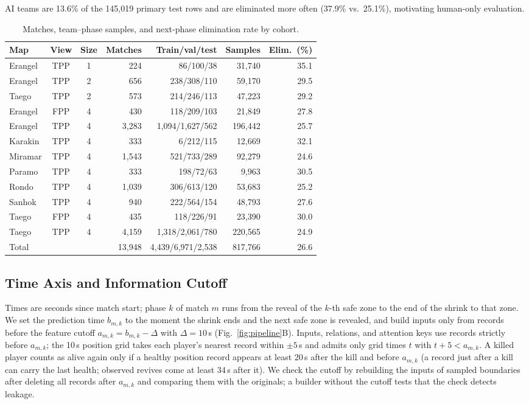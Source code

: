 \documentclass[sigconf,anonymous,nonacm]{acmart}
\begin{document}
AI teams are 13.6\% of the 145,019 primary test rows and are eliminated more often (37.9\% vs.\ 25.1\%), motivating human-only evaluation.

\begin{table}[t]
\centering
\caption{Matches, team--phase samples, and next-phase elimination rate by cohort.}
\label{tab:cohorts}
\footnotesize
\setlength{\tabcolsep}{2.7pt}
\begin{tabular}{lccrrrr}
\hline
Map & View & Size & Matches & Train/val/test & Samples & Elim.\ (\%) \\
\hline
Erangel & TPP & 1 & 224 & 86/100/38 & 31,740 & 35.1 \\
Erangel & TPP & 2 & 656 & 238/308/110 & 59,170 & 29.5 \\
Taego & TPP & 2 & 573 & 214/246/113 & 47,223 & 29.2 \\
Erangel & FPP & 4 & 430 & 118/209/103 & 21,849 & 27.8 \\
Erangel & TPP & 4 & 3,283 & 1,094/1,627/562 & 196,442 & 25.7 \\
Karakin & TPP & 4 & 333 & 6/212/115 & 12,669 & 32.1 \\
Miramar & TPP & 4 & 1,543 & 521/733/289 & 92,279 & 24.6 \\
Paramo & TPP & 4 & 333 & 198/72/63 & 9,963 & 30.5 \\
Rondo & TPP & 4 & 1,039 & 306/613/120 & 53,683 & 25.2 \\
Sanhok & TPP & 4 & 940 & 222/564/154 & 48,793 & 27.6 \\
Taego & FPP & 4 & 435 & 118/226/91 & 23,390 & 30.0 \\
Taego & TPP & 4 & 4,159 & 1,318/2,061/780 & 220,565 & 24.9 \\
\hline
Total & & & 13,948 & 4,439/6,971/2,538 & 817,766 & 26.6 \\
\hline
\end{tabular}
\end{table}

\subsection{Time Axis and Information Cutoff}
\label{sec:method:samples}
Times are seconds since match start; phase $k$ of match $m$ runs from the reveal of the $k$-th safe zone to the end of the shrink to that zone.
We set the prediction time $b_{m,k}$ to the moment the shrink ends and the next safe zone is revealed, and build inputs only from records before the feature cutoff $a_{m,k}=b_{m,k}-\Delta$ with $\Delta=10$\,s (Fig.~\ref{fig:pipeline}B). Inputs, relations, and attention keys use records strictly before $a_{m,k}$; the 10\,s position grid takes each player's nearest record within $\pm5$\,s and admits only grid times $t$ with $t+5<a_{m,k}$.
A killed player counts as alive again only if a healthy position record appears at least 20\,s after the kill and before $a_{m,k}$ (a record just after a kill can carry the last health; observed revives come at least 34\,s after it).
We check the cutoff by rebuilding the inputs of sampled boundaries after deleting all records after $a_{m,k}$ and comparing them with the originals; a builder without the cutoff tests that the check detects leakage.
\end{document}
